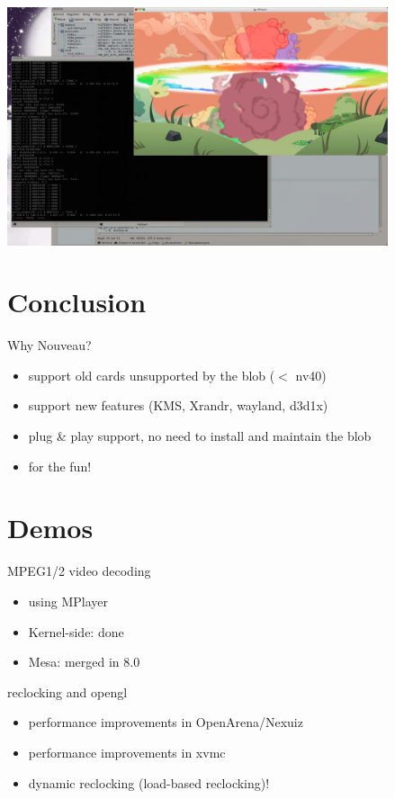 \documentclass[11pt,english,compress]{beamer}
\begin{document}
		\begin{frame}
			\begin{center}
				\includegraphics[height=7cm]{imgs/h264_vp_decoded2.png}
			\end{center}
		\end{frame}

\section{Conclusion}
		\begin{frame}
			\begin{block}{Why Nouveau?}
				\begin{itemize}
					\item support old cards unsupported by the blob ($<$ nv40)
					\item support new features (KMS, Xrandr, wayland, d3d1x)
					\item plug \& play support, no need to install and maintain the blob
					\item for the fun!
				\end{itemize}
			\end{block}
		\end{frame}

\section{Demos}
	\begin{frame}
		\begin{block}{MPEG1/2 video decoding}
			\begin{itemize}
				\item using MPlayer
				\item Kernel-side: done
				\item Mesa: merged in 8.0
			\end{itemize}
		\end{block}

		\begin{block}{reclocking and opengl}
			\begin{itemize}
				\item performance improvements in OpenArena/Nexuiz
				\item performance improvements in xvmc
				\item dynamic reclocking (load-based reclocking)!
			\end{itemize}
		\end{block}
	\end{frame}
\end{document}
